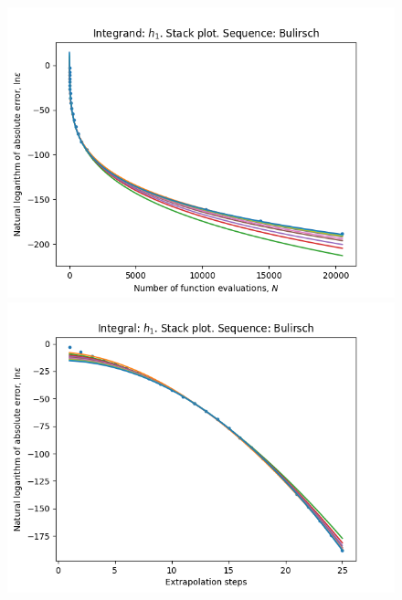 \begin{figure}[H]
\centering
\begin{minipage}{0.45\textwidth}
\centering
\includegraphics[scale=0.45]{../results/romberg_plots/h_one_hp_bulirsch_stack.png}
\end{minipage}
\begin{minipage}{0.45\textwidth}
\centering
\includegraphics[scale=0.45]{../results/romberg_plots/h_one_hp_bulirsch_steps_stack.png}
\end{minipage}
\end{figure}

